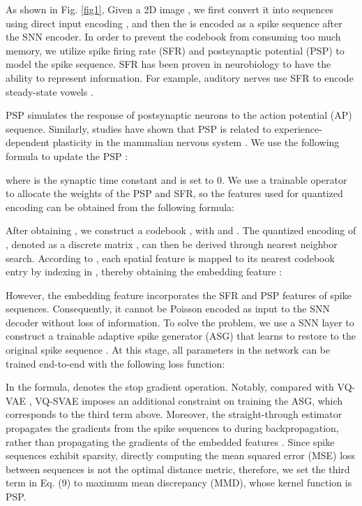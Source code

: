 \documentclass{article}
\begin{document}
As shown in Fig. \ref{fig1}, Given a 2D image , we first convert it into sequences  using direct input encoding \cite{coding}, and then the  is encoded as a spike sequence  after the SNN encoder. In order to prevent the codebook from consuming too much memory, we utilize spike firing rate (SFR) and postsynaptic potential (PSP) to model the spike sequence. SFR has been proven in neurobiology to have the ability to represent information. For example, auditory nerves use SFR to encode steady-state vowels \cite{b53}.

PSP simulates the response of postsynaptic neurons to the action potential (AP) sequence. Similarly, studies have shown that PSP is related to experience-dependent plasticity in the mammalian nervous system \cite{b54}. We use the following formula to update the PSP \cite{b55}: 

where  is the synaptic time constant and  is set to 0. We use a trainable operator  to allocate the weights of the PSP and SFR, so the features used for quantized encoding  can be obtained from the following formula:

After obtaining , we construct a codebook , with  and  . The quantized encoding of , denoted as a discrete matrix , can then be derived through nearest neighbor search. According to , each spatial feature  is mapped to its nearest codebook entry  by indexing in , thereby obtaining the embedding feature :


However, the embedding feature  incorporates the SFR and PSP features of spike sequences. Consequently, it cannot be Poisson encoded \cite{b55} as input to the SNN decoder without loss of information. To solve the problem, we use a SNN layer to construct a trainable adaptive spike generator (ASG) that learns to restore  to the original spike sequence . At this stage, all parameters in the network can be trained end-to-end with the following loss function:

In the formula,  denotes the stop gradient operation. Notably, compared with VQ-VAE \cite{b3}, VQ-SVAE imposes an additional constraint on training the ASG, which corresponds to the third term above. Moreover, the straight-through estimator propagates the gradients from the spike sequences  to  during backpropagation, rather than propagating the gradients of the embedded features . Since spike sequences exhibit sparsity, directly computing the mean squared error (MSE) loss between sequences is not the optimal distance metric, therefore, we set the third term in Eq. (9) to maximum mean discrepancy (MMD), whose kernel function is PSP.
\end{document}
